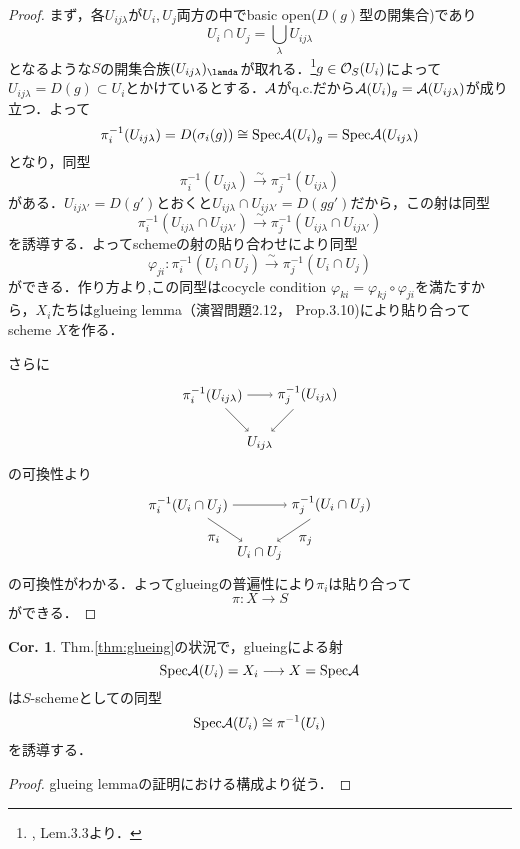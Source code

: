 \documentclass[dvipdfmx,b5paper,papersize]{jsarticle}
\theoremstyle{definition}
\newtheorem{cor}[thm]{Cor.}
\begin{document}
\begin{proof}
  まず，各$U_{ij\lambda}$が$U_i,U_j$両方の中でbasic open($D(g)$型の開集合)であり
  \[
    U_i \cap U_j=\bigcup_{\lambda}U_{ij\lambda}
  \]
  となるような$S$の開集合族$(U_{ij\lambda})_\lamda$が取れる．\footnote{\cite{Gortz}, Lem.3.3より．}$g \in {\cal{O}}_S(U_i)$によって$U_{ij\lambda}=D(g) \subset U_i$とかけているとする．$\cal{A}$がq.c.だから${\cal{A}}(U_i)_g={\cal{A}}(U_{ij\lambda})$が成り立つ．よって
  \[
  \pi_{i}^{-1}(U_{ij \lambda})=D(\sigma_i(g))\cong {\rm Spec}{\cal{A}}(U_i)_g={\rm Spec}{\cal{A}}(U_{ij\lambda})
  \]
  となり，同型
  \[
    \pi_{i}^{-1}(U_{ij\lambda}) \xrightarrow{\sim} \pi_{j}^{-1}(U_{ij\lambda})
  \]
  がある．$U_{ij\lambda'}=D(g')$とおくと$U_{ij\lambda} \cap U_{ij\lambda'}=D(gg')$だから，この射は同型
  \[
    \pi_{i}^{-1}(U_{ij\lambda} \cap U_{ij\lambda'}) \xrightarrow{\sim} \pi_{j}^{-1}(U_{ij\lambda} \cap U_{ij\lambda'})
  \]
  を誘導する．よってschemeの射の貼り合わせにより同型
  \[
    \varphi_{ji}:\pi_{i}^{-1}(U_i\cap U_j) \xrightarrow{\sim} \pi_{j}^{-1}(U_i\cap U_j)
  \]
  ができる．作り方より,この同型はcocycle condition $\varphi_{ki}=\varphi_{kj} \circ \varphi_{ji}$を満たすから，$X_i$たちはglueing lemma（\cite{ハーツホーン}演習問題2.12，\cite{Gortz} Prop.3.10)により貼り合ってscheme $X$を作る．

  さらに
  \[
    \begin{tikzpicture}[auto,->]
      \node (a) at (0,1.2) {$\pi_{i}^{-1}(U_{ij\lambda})$}; \node (x) at (2.4,1.2) {$\pi_{j}^{-1}(U_{ij\lambda})$};
      \node (b) at (1.2,0) {$U_{ij\lambda}$};
      \draw (a) -- node {$\scriptstyle $} (x);

      \draw (a) -- node[swap] {$\scriptstyle $} (b);
      \draw (x) -- node[swap] {$\scriptstyle $} (b);
    \end{tikzpicture}
  \]
  の可換性より
  \[
    \begin{tikzpicture}[auto,->]
      \node (a) at (0,1.2) {$\pi_{i}^{-1}(U_i \cap U_j)$}; \node (x) at (3.6,1.2) {$\pi_{j}^{-1}(U_i \cap U_j)$};
      \node (b) at (1.8,0) {$U_i \cap U_j$};
      \draw (a) -- node {$\scriptstyle $} (x);

      \draw (a) -- node[swap] {$\pi_i$} (b);
      \draw (x) -- node {$\pi_j$} (b);
    \end{tikzpicture}
  \]
  の可換性がわかる．よってglueingの普遍性により$\pi_i$は貼り合って
  \[
    \pi:X \longrightarrow S
  \]
  ができる．
\end{proof}

\begin{cor}\label{thm:iso}
  {\rm Thm.\ref{thm:glueing}}の状況で，glueingによる射
  \[
    {\rm Spec}{\cal{A}}(U_i)=X_i \longrightarrow X={\rm Spec}{\cal{A}}
  \]
  は$S$-schemeとしての同型
  \[
    {\rm Spec}{\cal{A}}(U_i)\cong \pi^{-1}(U_i)
  \]
  を誘導する．
\end{cor}
\begin{proof}
  glueing lemmaの証明における構成より従う．

\end{proof}
\end{document}
